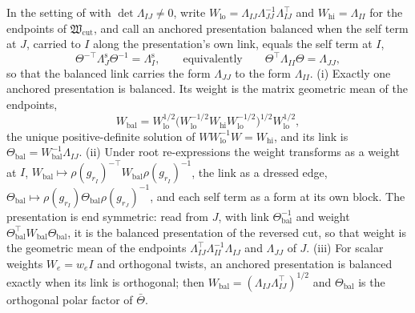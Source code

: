In the setting of  with $\det\Lambda_{IJ}\neq0$, write
$W_{\mathrm{lo}}=\Lambda_{IJ}\Lambda_{JJ}^{-1}\Lambda_{IJ}^\top$ and $W_{\mathrm{hi}}=\Lambda_{II}$ for the endpoints
of $\mathfrak W_{\mathrm{cut}}$, and call an anchored presentation balanced when the self term at $J$,
carried to $I$ along the presentation's own link, equals the self term at $I$,
\begin{equation}
\Theta^{-\top}\Lambda^{\mathrm s}_J\Theta^{-1}=\Lambda^{\mathrm s}_I,
\qquad\text{equivalently}\qquad
\Theta^\top\Lambda_{II}\Theta=\Lambda_{JJ},
\label{eq:cg-cut-balance}
\end{equation}
so that the balanced link carries the form $\Lambda_{JJ}$ to the form $\Lambda_{II}$. (i) Exactly one
anchored presentation is balanced. Its weight is the matrix geometric mean of the endpoints,
\begin{equation}
W_{\mathrm{bal}}=W_{\mathrm{lo}}^{1/2}\bigl(W_{\mathrm{lo}}^{-1/2}W_{\mathrm{hi}}W_{\mathrm{lo}}^{-1/2}\bigr)^{1/2}W_{\mathrm{lo}}^{1/2},
\label{eq:cg-cut-balanced-weight}
\end{equation}
the unique positive-definite solution of $WW_{\mathrm{lo}}^{-1}W=W_{\mathrm{hi}}$, and its link is
$\Theta_{\mathrm{bal}}=W_{\mathrm{bal}}^{-1}\Lambda_{IJ}$. (ii) Under root re-expressions the weight transforms
as a weight at $I$, $W_{\mathrm{bal}}\mapsto\rho(g_{r_I})^{-\top}W_{\mathrm{bal}}\rho(g_{r_I})^{-1}$, the link as a
dressed edge, $\Theta_{\mathrm{bal}}\mapsto\rho(g_{r_I})\Theta_{\mathrm{bal}}\rho(g_{r_J})^{-1}$, and each self
term as a form at its own block. The presentation is end symmetric: read from $J$, with link
$\Theta_{\mathrm{bal}}^{-1}$ and weight $\Theta_{\mathrm{bal}}^\top W_{\mathrm{bal}}\Theta_{\mathrm{bal}}$, it is the
balanced presentation of the reversed cut, so that weight is the geometric mean of the endpoints
$\Lambda_{IJ}^\top\Lambda_{II}^{-1}\Lambda_{IJ}$ and $\Lambda_{JJ}$ of $J$. (iii) For scalar weights
$W_e=w_eI$ and orthogonal twists, an anchored presentation is balanced exactly when its link is
orthogonal; then $W_{\mathrm{bal}}=(\Lambda_{IJ}\Lambda_{IJ}^\top)^{1/2}$ and $\Theta_{\mathrm{bal}}$ is the
orthogonal polar factor of $\bar\Theta$. 

